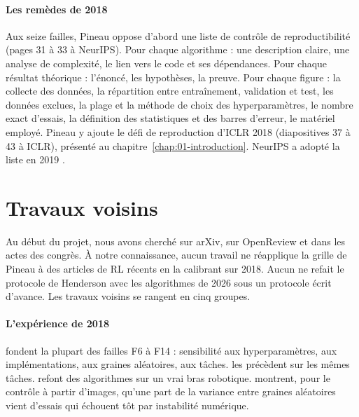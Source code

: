 \paragraph{Les remèdes de 2018}
Aux seize failles, Pineau oppose d'abord une liste de contrôle de reproductibilité (pages 31 à
33 à NeurIPS). Pour chaque algorithme : une description claire, une analyse de complexité, le lien vers
le code et ses dépendances. Pour chaque résultat théorique : l'énoncé, les hypothèses, la preuve. Pour
chaque figure : la collecte des données, la répartition entre entraînement, validation et test, les
données exclues, la plage et la méthode de choix des hyperparamètres, le nombre exact d'essais, la
définition des statistiques et des barres d'erreur, le matériel employé. Pineau y ajoute le défi de
reproduction d'ICLR 2018 (diapositives 37 à 43 à ICLR), présenté au chapitre~\ref{chap:01-introduction}.
NeurIPS a adopté la liste en 2019 \parencite{pineau2021improving}.

\section{Travaux voisins}\label{sec:voisins}

Au début du projet, nous avons cherché sur arXiv, sur OpenReview et dans les actes des congrès. À notre
connaissance, aucun travail ne réapplique la grille de Pineau à des articles de RL récents en la
calibrant sur 2018. Aucun ne refait le protocole de Henderson avec les algorithmes de
2026 sous un protocole écrit d'avance. Les travaux voisins se rangent en cinq groupes.

\paragraph{L'expérience de 2018}
\textcite{henderson2018matters} fondent la plupart des failles F6 à F14 : sensibilité aux
hyperparamètres, aux implémentations, aux graines aléatoires, aux tâches. \textcite{islam2017reproducibility}
les précèdent sur les mêmes tâches. \textcite{lynnerup2020survey} refont des algorithmes sur un vrai
bras robotique. \textcite{bjorck2022variance} montrent, pour le contrôle à partir d'images, qu'une part
de la variance entre graines aléatoires vient d'essais qui échouent tôt par instabilité numérique.

